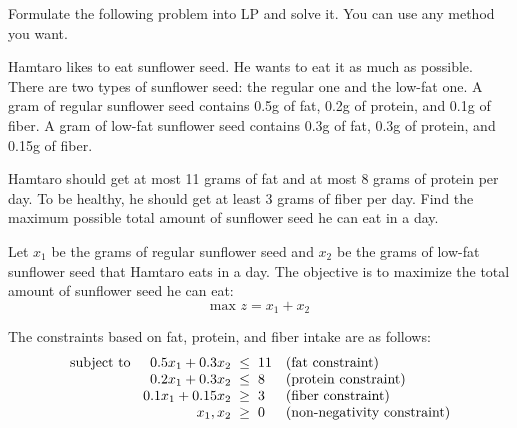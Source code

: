 \documentclass[a4paper, 10pt]{article}
\begin{document}
\begin{tosubmit}
\problem[4] Formulate the following problem into LP and solve it.
You can use any method you want.

\vspace{3mm}

Hamtaro likes to eat sunflower seed. He wants to eat it as much as possible. There are two
types of sunflower seed: the regular one and the low-fat one. A gram of regular sunflower
seed contains 0.5g of fat, 0.2g of protein, and 0.1g of fiber. A gram of low-fat sunflower seed
contains 0.3g of fat, 0.3g of protein, and 0.15g of fiber.

\vspace{3mm}

Hamtaro should get at most 11 grams of fat and at most 8 grams of protein per day. To be
healthy, he should get at least 3 grams of fiber per day. Find the maximum possible total
amount of sunflower seed he can eat in a day.

\vspace{3mm}

\par\noindent\submitsolution
Let \( x_1 \) be the grams of regular sunflower seed and \( x_2 \) be the grams of low-fat sunflower seed that Hamtaro eats in a day.
The objective is to maximize the total amount of sunflower seed he can eat:
\[ \text{max } z = x_1 + x_2 \]

\newpage

The constraints based on fat, protein, and fiber intake are as follows:
\[
\begin{array}{@{\hspace{2mm}} r @{\hspace{2mm}} r @{\hspace{2mm}} c @{\hspace{2mm}} ll}
    \text{subject to } & 0.5x_1 + 0.3x_2 & \leq & 11 & \text{(fat constraint)} \\
    & 0.2x_1 + 0.3x_2 & \leq & 8 & \text{(protein constraint)} \\
    & 0.1x_1 + 0.15x_2 & \geq & 3 & \text{(fiber constraint)} \\
    & x_1, x_2 & \geq & 0 & \text{(non-negativity constraint)}
\end{array}
\]


\end{tosubmit}
\end{document}
